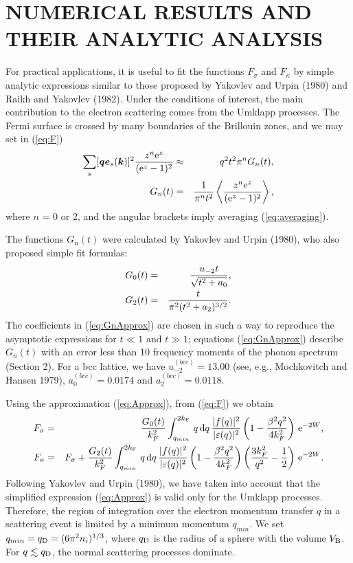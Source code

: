 \section{NUMERICAL RESULTS AND THEIR ANALYTIC ANALYSIS}
For practical applications, it is useful to fit the functions
$F_\sigma$ and $F_\kappa$ by simple analytic expressions similar to those
proposed by Yakovlev and Urpin (1980) and Raikh and Yakovlev
(1982). Under the conditions of interest, the main contribution to
the electron scattering comes from the Umklapp processes. The Fermi
surface is crossed by many boundaries of the Brillouin zones, and we
may set in (\ref{eq:F})
\begin{eqnarray}
         \sum_s [ \mbox{\boldmath $q$} \mbox{\boldmath $e$}_s(\mbox{\boldmath $k$})]^2
       { z^n {\rm e}^{z} \over ({\rm e}^{z} -1 )^2}
       & \approx & q^2 t^2 \pi^n G_n(t),
\label{eq:Approx} \\
   G_n(t) & = & {1 \over \pi^n t^2} \left\langle  { z^n {\rm e}^z
                \over ({\rm e}^z -1)^2} \right\rangle,
\label{eq:Gn}
\end{eqnarray}
where $n$ = 0 or 2, and the angular brackets imply averaging 
(\ref{eq:averaging}). 

The functions $G_n(t)$ were calculated by Yakovlev and Urpin
(1980), who also proposed simple fit formulas:
%
\begin{eqnarray}
   G_0(t) & = & {u_{-2} t \over \sqrt{t^2 + a_0  }},
\nonumber \\
   G_2(t) & = & { t \over \pi^2 (t^2+ a_2)^{3/2} }.
\label{eq:GnApprox}
\end{eqnarray}
%
The coefficients in (\ref{eq:GnApprox}) are chosen in such a way 
to reproduce the asymptotic expressions for $t \ll 1$ and $t \gg 1$;
equations (\ref{eq:GnApprox}) describe $G_n(t)$ with an error 
less than 10%
frequency moments of the phonon spectrum (Section 2). For a
bcc lattice, we have $u_{-2}^{(bcc)}=13.00$ (see, e.g., Mochkovitch 
and Hansen 1979), $a_0^{(bcc)}=0.0174$ and $a_2^{(bcc)}=0.0118$.

Using the approximation (\ref{eq:Approx}), from (\ref{eq:F}) we obtain
%
\begin{eqnarray}
    F_\sigma & = & {G_0(t) \over k_F^2} \int_{q_{min}}^{2k_{\rm F}} \,
       q \, \mbox{d} q \, { | f(q)|^2 \over |\varepsilon (q)|^2}
       \left(1- {\beta^2 q^2 \over 4 k_F^2} \right) \, {\rm e}^{-2W},
\nonumber \\
   F_\kappa & = & F_\sigma +
       {G_2(t) \over k_F^2} \int_{q_{min}}^{2k_{\rm F}} \,
       q \, \mbox{d} q \, { | f(q)|^2 \over |\varepsilon (q)|^2}
       \left(1- {\beta^2 q^2 \over 4 k_F^2} \right)
       \left( {3 k_F^2 \over q^2} -{1 \over 2} \right) \, {\rm e}^{-2W}.
\label{eq:FApprox}
\end{eqnarray}
%
Following Yakovlev and Urpin (1980), we have taken into account
that the simplified expression (\ref{eq:Approx}) is valid only 
for the Umklapp processes. Therefore, the region of integration over
the electron momentum transfer $q$ in a scattering event is limited
by a minimum momentum $q_{min}$. We set $q_{min} = q_{\rm D} = 
(6 \pi^2 n_i)^{1/3}$, where $q_{\rm D}$ is
the radius of a sphere with the volume $V_{\rm B}$.
For $q \la q_{\rm D}$, the normal scattering processes dominate.

